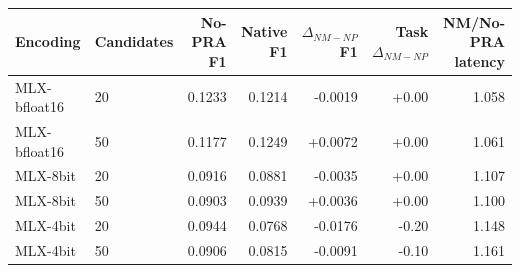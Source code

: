 \begin{tabular}{llrrrrr}
\toprule
Encoding & Candidates & No-PRA F1 & Native F1 & $\Delta_{NM-NP}$ F1 & Task $\Delta_{NM-NP}$ & NM/No-PRA latency \\
\midrule
MLX-bfloat16 & 20 & 0.1233 & 0.1214 & -0.0019 & +0.00 & 1.058 \\
MLX-bfloat16 & 50 & 0.1177 & 0.1249 & +0.0072 & +0.00 & 1.061 \\
MLX-8bit & 20 & 0.0916 & 0.0881 & -0.0035 & +0.00 & 1.107 \\
MLX-8bit & 50 & 0.0903 & 0.0939 & +0.0036 & +0.00 & 1.100 \\
MLX-4bit & 20 & 0.0944 & 0.0768 & -0.0176 & -0.20 & 1.148 \\
MLX-4bit & 50 & 0.0906 & 0.0815 & -0.0091 & -0.10 & 1.161 \\
\bottomrule
\end{tabular}
